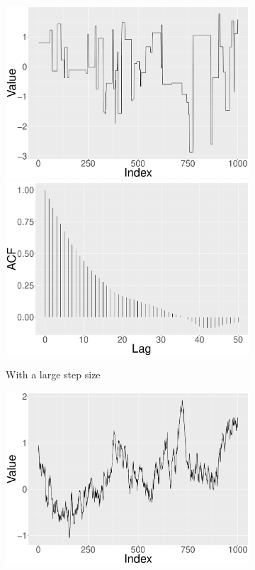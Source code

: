 \begin{figure}[h]
\centering
 \begin{subfigure}[b]{0.32\textwidth}
   \includegraphics[width=\textwidth]{Chapters/05MCMCOU/plots/gglargechain_Final.pdf}
    \includegraphics[width=\textwidth]{Chapters/05MCMCOU/plots/gglargeacf_Final.pdf}
     \caption{With a large step size}\label{MCMClargestep}
\end{subfigure}
\begin{subfigure}[b]{0.32\textwidth}
    \includegraphics[width=\textwidth]{Chapters/05MCMCOU/plots/ggsmallchain_Final.pdf}

\end{subfigure}
\end{figure}
